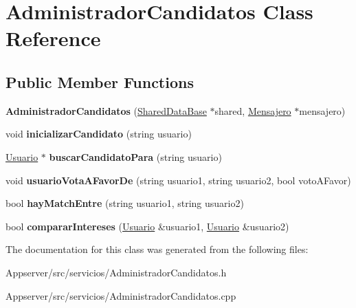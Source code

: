 \hypertarget{classAdministradorCandidatos}{}\section{Administrador\+Candidatos Class Reference}
\label{classAdministradorCandidatos}
\subsection*{Public Member Functions}
\begin{DoxyCompactItemize}
\item 
{\bfseries Administrador\+Candidatos} (\hyperlink{classSharedDataBase}{Shared\+Data\+Base} $\ast$shared, \hyperlink{classMensajero}{Mensajero} $\ast$mensajero)\hypertarget{classAdministradorCandidatos_aa1476ca2bb83e5e931c3c03378e1eb99}{}\label{classAdministradorCandidatos_aa1476ca2bb83e5e931c3c03378e1eb99}

\item 
void {\bfseries inicializar\+Candidato} (string usuario)\hypertarget{classAdministradorCandidatos_aa5b67a2e1ecb99cb12427fc59cbe1fa8}{}\label{classAdministradorCandidatos_aa5b67a2e1ecb99cb12427fc59cbe1fa8}

\item 
\hyperlink{classUsuario}{Usuario} $\ast$ {\bfseries buscar\+Candidato\+Para} (string usuario)\hypertarget{classAdministradorCandidatos_a5a27cb9f07ec5c10a92ff9002e3d009a}{}\label{classAdministradorCandidatos_a5a27cb9f07ec5c10a92ff9002e3d009a}

\item 
void {\bfseries usuario\+Vota\+A\+Favor\+De} (string usuario1, string usuario2, bool voto\+A\+Favor)\hypertarget{classAdministradorCandidatos_a0c59aa4d5c06f8a7b48c04b0380293ee}{}\label{classAdministradorCandidatos_a0c59aa4d5c06f8a7b48c04b0380293ee}

\item 
bool {\bfseries hay\+Match\+Entre} (string usuario1, string usuario2)\hypertarget{classAdministradorCandidatos_a5b64e63a07f2289bc72296d3b523f2ef}{}\label{classAdministradorCandidatos_a5b64e63a07f2289bc72296d3b523f2ef}

\item 
bool {\bfseries comparar\+Intereses} (\hyperlink{classUsuario}{Usuario} \&usuario1, \hyperlink{classUsuario}{Usuario} \&usuario2)\hypertarget{classAdministradorCandidatos_ab0ac32f8834aff9bfb7aa4da33bfe57c}{}\label{classAdministradorCandidatos_ab0ac32f8834aff9bfb7aa4da33bfe57c}

\end{DoxyCompactItemize}


The documentation for this class was generated from the following files\+:\begin{DoxyCompactItemize}
\item 
Appserver/src/servicios/Administrador\+Candidatos.\+h\item 
Appserver/src/servicios/Administrador\+Candidatos.\+cpp\end{DoxyCompactItemize}
